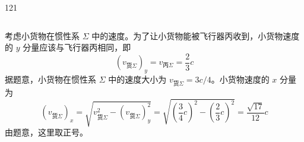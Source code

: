 \begin{solution}{121}
\begin{subsolution}
\begin{equation}
        \end{equation}
    \end{subsolution}
    \begin{subsolution}
        考虑小货物在惯性系 $\Sigma$ 中的速度。为了让小货物能被飞行器丙收到，小货物速度的 $y$ 分量应该与飞行器丙相同，即
        \begin{equation}
            (v_{\text{货}\Sigma})_{y} = v_{\text{丙}\Sigma} = \frac{2}{3} c
            \label{eq:6.s121}
        \end{equation}
        据题意，小货物在惯性系 $\Sigma$ 中的速度大小为 $v_{\text{货}\Sigma} = 3c/4$。小货物速度的 $x$ 分量为
        \begin{equation}
            (v_{\text{货}\Sigma})_{x} = \sqrt{v_{\text{货}\Sigma}^{2} - (v_{\text{货}\Sigma})_{y}^{2}} = \sqrt{\left(\frac{3}{4} c\right)^{2} - \left(\frac{2}{3} c\right)^{2}} = \frac{\sqrt{17}}{12} c
            \label{eq:7.s121}
        \end{equation}
        由题意，这里取正号。


\end{subsolution}
\end{solution}
